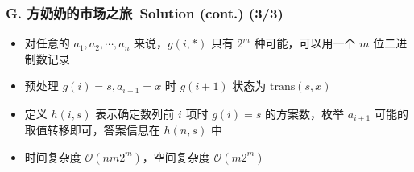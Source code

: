 \documentclass[notheorems]{beamer}
\newcommand{\zhProbG}{方奶奶的市场之旅}	\newcommand{\DiffG}{Very Hard}	\newcommand{\AuthProbG}{\texttt{ShinriiTin}}	\newcommand{\TestProbG}{\texttt{skywalkert}}
\newcommand{\AccInProbG}{3}	\newcommand{\SubInProbG}{3}	\newcommand{\RatInProbG}{100.0\%}
\begin{document}
\begin{frame}
\frametitle{\\ G. \zhProbG\ Solution (cont.) (\AccInProbG/\SubInProbG)}
\begin{spacing}{2.0} \large
\begin{itemize}
\item 对任意的 $a_1, a_2, \cdots, a_n$ 来说，$g(i, \ast)$ 只有 $2^m$ 种可能，可以用一个 $m$ 位二进制数记录 \pause
\item 预处理 $g(i) = s, a_{i + 1} = x$ 时 $g(i + 1)$ 状态为 $\mathrm{trans}(s, x)$
\item 定义 $h(i, s)$ 表示确定数列前 $i$ 项时 $g(i) = s$ 的方案数，枚举 $a_{i + 1}$ 可能的取值转移即可，答案信息在 $h(n, s)$ 中
\item 时间复杂度 $\mathcal{O}(n m 2^m)$，空间复杂度 $\mathcal{O}(m 2^m)$
\end{itemize}
\end{spacing}
\end{frame}
\end{document}
